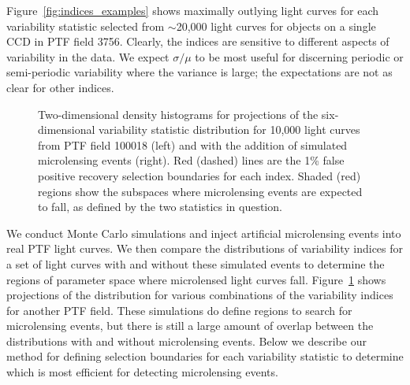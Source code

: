 \documentclass{emulateapj}
\begin{document}
Figure~\ref{fig:indices_examples} shows maximally outlying light curves for each variability statistic selected from $\sim$20,000 light curves for objects on a single CCD in PTF field 3756. %
Clearly, the indices are sensitive to different aspects of variability in the data. We expect $\sigma/\mu$ to be most useful for discerning periodic or semi-periodic variability where the variance is large; the expectations are not as clear for other indices. 

\begin{figure}[h]
\centering
	
	
	\caption{Two-dimensional density histograms for projections of the six-dimensional variability statistic distribution for 10,000 light curves from PTF field 100018 (left) and with the addition of simulated microlensing events (right). Red (dashed) lines are the 1\% false positive recovery selection boundaries for each index. Shaded (red) regions show the subspaces where microlensing events are expected to fall, as defined by the two statistics in question. } 
	\label{fig:var_indices}
\end{figure}

We conduct Monte Carlo simulations and inject artificial microlensing events into real PTF light curves. We then compare the distributions of variability indices for a set of light curves with and without these simulated events to determine the regions of parameter space where microlensed light curves fall. Figure~\ref{fig:var_indices} shows projections of the distribution for various combinations of the variability indices for another PTF field. These simulations do define regions to search for microlensing events, but there is still a large amount of overlap between the distributions with and without microlensing events. Below we describe our method for defining selection boundaries for each variability statistic to determine which is most efficient for detecting microlensing events.
\end{document}

